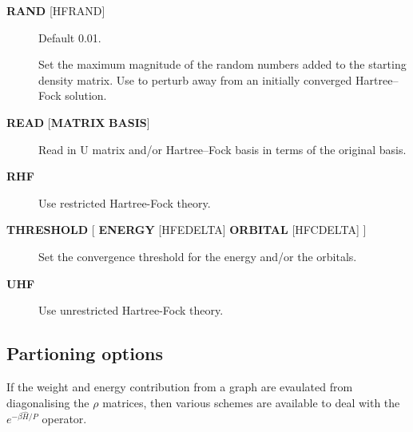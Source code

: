 \documentclass[openany,a4paper,10pt,english]{manual}
\begin{document}
\begin{description}
\item[\textbf{RAND} {[}HFRAND{]}] \leavevmode
Default 0.01.

Set the maximum magnitude of the random numbers added to the starting density matrix.
Use to perturb away from an initially converged Hartree--Fock solution.

\item[\textbf{READ} {[}\textbf{MATRIX} \textbf{BASIS}{]}] \leavevmode
Read in U matrix and/or Hartree--Fock basis in terms of the original basis.

\item[\textbf{RHF}] \leavevmode
Use restricted Hartree-Fock theory.

\item[\textbf{THRESHOLD} {[} \textbf{ENERGY} {[}HFEDELTA{]} \textbf{ORBITAL} {[}HFCDELTA{]} {]}] \leavevmode
Set the convergence threshold for the energy and/or the orbitals.

\item[\textbf{UHF}] \leavevmode
Use unrestricted Hartree-Fock theory.

\end{description}


\subsection{Partioning options}

If the weight and energy contribution from a graph are evaulated from
diagonalising the $\rho$ matrices, then various schemes are
available to deal with the $e^{-\beta\hat{H}/P}$ operator.
\end{document}
